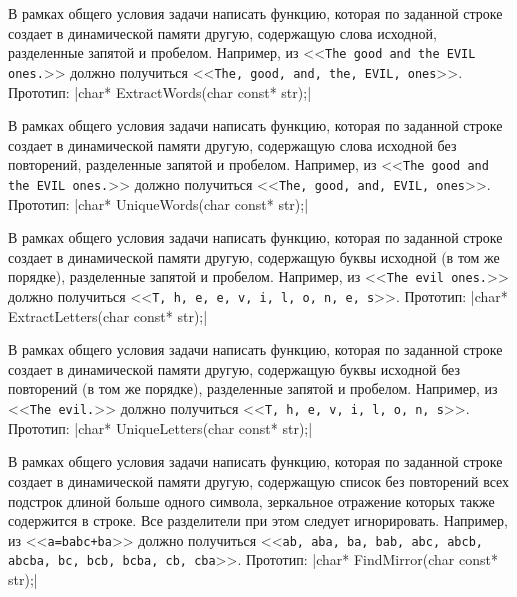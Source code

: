 \zzsectionVARIATIONS


\begin{zztask}
В рамках общего условия задачи написать функцию, которая по заданной строке
создает в динамической памяти другую, содержащую слова исходной,
разделенные запятой и пробелом.
Например, из
<<\texttt{The good and the EVIL ones.}>>
должно получиться
<<\texttt{The, good, and, the, EVIL, ones}>>.
%
Прототип: |char* ExtractWords(char const* str);|
\end{zztask}

\begin{zztask}
В рамках общего условия задачи написать функцию, которая по заданной строке
создает в динамической памяти другую, содержащую слова исходной без
повторений, разделенные запятой и пробелом.
Например, из
<<\texttt{The good and the EVIL ones.}>>
должно получиться
<<\texttt{The, good, and, EVIL, ones}>>.
%
Прототип: |char* UniqueWords(char const* str);|
\end{zztask}

\begin{zztask}
В рамках общего условия задачи написать функцию, которая по заданной строке
создает в динамической памяти другую, содержащую буквы исходной (в том же
порядке), разделенные запятой и пробелом.
Например, из
<<\texttt{The evil ones.}>>
должно получиться
<<\texttt{T, h, e, e, v, i, l, o, n, e, s}>>.
%
Прототип: |char* ExtractLetters(char const* str);|
\end{zztask}

\begin{zztask}
В рамках общего условия задачи написать функцию, которая по заданной строке
создает в динамической памяти другую, содержащую буквы исходной без
повторений (в том же порядке), разделенные запятой и пробелом.
Например, из
<<\texttt{The evil.}>>
должно получиться
<<\texttt{T, h, e, v, i, l, o, n, s}>>.
%
Прототип: |char* UniqueLetters(char const* str);|
\end{zztask}

\begin{zztask}
В рамках общего условия задачи написать функцию, которая по заданной строке
создает в динамической памяти другую, содержащую список без повторений всех
подстрок длиной больше одного символа, зеркальное отражение которых также
содержится в строке. Все разделители при этом следует игнорировать.
Например, из
<<\texttt{a=babc+ba}>>
должно получиться
<<\texttt{ab, aba, ba, bab, abc, abcb, abcba, bc, bcb, bcba, cb, cba}>>.
%
Прототип: |char* FindMirror(char const* str);|
\end{zztask}

